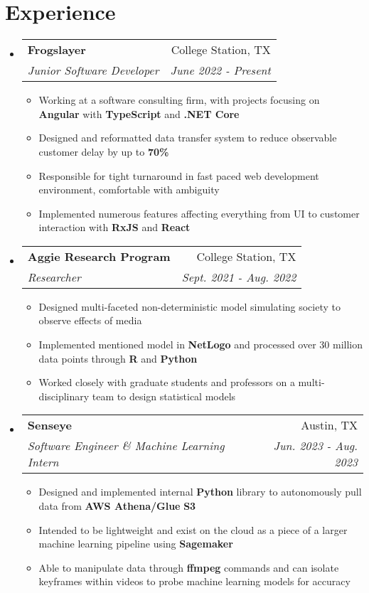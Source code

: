 \documentclass[letterpaper,10pt]{article}
\makeatletter
\newcommand{\resumeItemDescription}[1]{
  \item\small{
    #1 \vspace{-2pt}
  }
}
\newcommand{\resumeSubheading}[4]{
  \vspace{-1pt}\item
    \begin{tabular*}{0.97\textwidth}[t]{l@{\extracolsep{\fill}}r}
      \textbf{#1} & #2 \\
      \textit{\small#3} & \textit{\small #4} \\
    \end{tabular*}\vspace{-5pt}
}
\newcommand{\resumeSubHeadingListStart}{\begin{itemize}[leftmargin=*]}
\newcommand{\resumeSubHeadingListEnd}{\end{itemize}}
\newcommand{\resumeItemListStart}{\begin{itemize}}
\newcommand{\resumeItemListEnd}{\end{itemize}\vspace{-5pt}}
\makeatother
\begin{document}
\section{Experience}
  \resumeSubHeadingListStart
  	\resumeSubheading
  		{Frogslayer}{College Station, TX}
  		{Junior Software Developer}{June 2022 - Present}
  		\resumeItemListStart
  			\resumeItemDescription{Working at a software consulting firm, with projects focusing on \textbf{Angular} with \textbf{TypeScript} and \textbf{.NET Core}}
  			\resumeItemDescription{Designed and reformatted data transfer system to reduce observable customer delay by up to \textbf{70\%}}
  			\resumeItemDescription{Responsible for tight turnaround in fast paced web development environment, comfortable with ambiguity}
  			\resumeItemDescription{Implemented numerous features affecting everything from UI to customer interaction with \textbf{RxJS} and \textbf{React}}
  		\resumeItemListEnd
  	\resumeSubheading
  		{Aggie Research Program}{College Station, TX}
  		{Researcher}{Sept. 2021 - Aug. 2022}
  		\resumeItemListStart
  			\resumeItemDescription{Designed multi-faceted non-deterministic model simulating society to observe effects of media}
  			\resumeItemDescription{Implemented mentioned model in \textbf{NetLogo} and processed over 30 million data points through \textbf{R} and \textbf{Python}}
  			\resumeItemDescription{Worked closely with graduate students and professors on a multi-disciplinary team to design statistical models}
  		\resumeItemListEnd
	\resumeSubheading
  		{Senseye}{Austin, TX}
  		{Software Engineer \& Machine Learning Intern}{Jun. 2023 - Aug. 2023}
  		\resumeItemListStart
  			\resumeItemDescription{Designed and implemented internal \textbf{Python} library to autonomously pull data from \textbf{AWS Athena/Glue} \textbf{S3}}
  			\resumeItemDescription{Intended to be lightweight and exist on the cloud as a piece of a larger machine learning pipeline using \textbf{Sagemaker}}
  			\resumeItemDescription{Able to manipulate data through \textbf{ffmpeg} commands and can isolate keyframes within videos to probe machine learning models for accuracy}
  		\resumeItemListEnd
  \resumeSubHeadingListEnd


\end{document}
